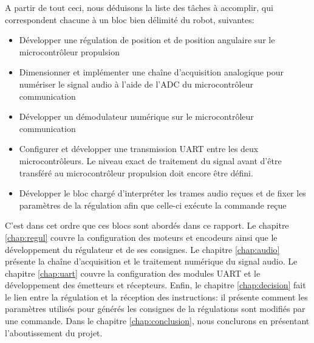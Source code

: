 A partir de tout ceci, nous déduisons la liste des tâches à accomplir, qui correspondent chacune à un bloc bien délimité du robot, suivantes:
\begin{itemize}
  \item Développer une régulation de position et de position angulaire sur le microcontrôleur propulsion
  \item Dimensionner et implémenter une chaîne d'acquisition analogique pour numériser le signal audio à l'aide de l'ADC du microcontrôleur communication
  \item Développer un démodulateur numérique sur le microcontrôleur communication
  \item Configurer et développer une transmission UART entre les deux microcontrôleurs. Le niveau exact de traitement du signal avant d'être transféré au microcontrôleur propulsion doit encore être défini.
  \item Développer le bloc chargé d'interpréter les trames audio reçues et de fixer les paramètres de la régulation afin que celle-ci exécute la commande reçue
\end{itemize}

C'est dans cet ordre que ces blocs sont abordés dans ce rapport. Le chapitre \ref{chap:regul} couvre la configuration des moteurs et encodeurs ainsi que le développement du régulateur et de ses consignes. Le chapitre \ref{chap:audio} présente la chaîne d'acquisition et le traitement numérique du signal audio. Le chapitre \ref{chap:uart} couvre la configuration des modules UART et le développement des émetteurs et récepteurs. Enfin, le chapitre \ref{chap:decision} fait le lien entre la régulation et la réception des instructions: il présente comment les paramètres utilisés pour générés les consignes de la régulations sont modifiés par une commande. Dans le chapitre \ref{chap:conclusion}, nous conclurons en présentant l'aboutissement du projet.

